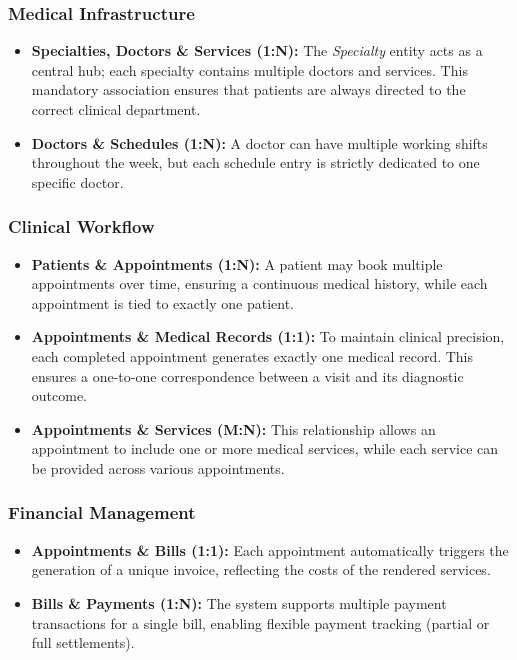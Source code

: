 \subsubsection{Medical Infrastructure}
\begin{itemize}
	\item \textbf{Specialties, Doctors \& Services (1:N):} The \textit{Specialty} entity acts as a central hub; each specialty contains multiple doctors and services. This mandatory association ensures that patients are always directed to the correct clinical department.
	\item \textbf{Doctors \& Schedules (1:N):} A doctor can have multiple working shifts throughout the week, but each schedule entry is strictly dedicated to one specific doctor.
\end{itemize}

\subsubsection{Clinical Workflow}
\begin{itemize}
	\item \textbf{Patients \& Appointments (1:N):} A patient may book multiple appointments over time, ensuring a continuous medical history, while each appointment is tied to exactly one patient.
	\item \textbf{Appointments \& Medical Records (1:1):} To maintain clinical precision, each completed appointment generates exactly one medical record. This ensures a one-to-one correspondence between a visit and its diagnostic outcome.
	\item \textbf{Appointments \& Services (M:N):} This relationship allows an appointment to include one or more medical services, while each service can be provided across various appointments.
\end{itemize}

\subsubsection{Financial Management}
\begin{itemize}
	\item \textbf{Appointments \& Bills (1:1):} Each appointment automatically triggers the generation of a unique invoice, reflecting the costs of the rendered services.
	\item \textbf{Bills \& Payments (1:N):} The system supports multiple payment transactions for a single bill, enabling flexible payment tracking (partial or full settlements).
\end{itemize}
